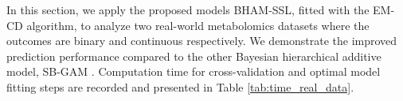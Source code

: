 \documentclass[AMA,STIX1COL,]{WileyNJD-v2}
\begin{document}
\label{sec:real_data}

In this section, we apply the proposed models BHAM-SSL, fitted with the
EM-CD algorithm, to analyze two real-world metabolomics datasets where
the outcomes are binary and continuous respectively. We demonstrate the
improved prediction performance compared to the other Bayesian
hierarchical additive model, SB-GAM \citep{Bai2021}. Computation time
for cross-validation and optimal model fitting steps are recorded and
presented in Table \ref{tab:time_real_data}.

\providecommand{\docline}[3]{\noalign{\global\setlength{\arrayrulewidth}{#1}}\arrayrulecolor[HTML]{#2}\cline{#3}}

\setlength{\tabcolsep}{2pt}

\renewcommand*{\arraystretch}{1.5}
\end{document}
